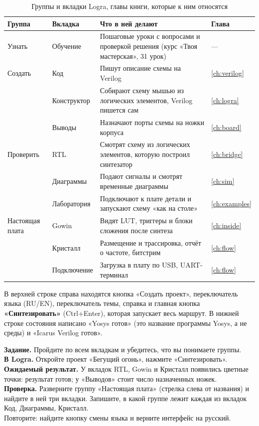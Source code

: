 \begin{table}[H]
\centering
\caption{Группы и вкладки Logra, главы книги, которые к ним относятся}
\small
\begin{tabularx}{\textwidth}{l l X l}
\toprule
\textbf{Группа} & \textbf{Вкладка} & \textbf{Что в ней делают} & \textbf{Глава} \\
\midrule
Узнать & Обучение & Пошаговые уроки с вопросами и проверкой решения (курс «Твоя мастерская», 31 урок) & --- \\
\midrule
Создать & Код & Пишут описание схемы на Verilog & \ref{ch:verilog} \\
 & Конструктор & Собирают схему мышью из логических элементов, Verilog пишется сам & \ref{ch:logra} \\
 & Выводы & Назначают порты схемы на ножки корпуса & \ref{ch:board} \\
\midrule
Проверить & RTL & Смотрят схему из логических элементов, которую построил синтезатор & \ref{ch:bridge} \\
 & Диаграммы & Подают сигналы и смотрят временные диаграммы & \ref{ch:sim} \\
 & Лаборатория & Подключают к плате детали и запускают схему «как на столе» & \ref{ch:examples} \\
\midrule
Настоящая плата & Gowin & Видят LUT, триггеры и блоки сложения после синтеза & \ref{ch:inside} \\
 & Кристалл & Размещение и трассировка, отчёт о частоте, битстрим & \ref{ch:flow} \\
 & Подключение & Загрузка в плату по USB, UART-терминал & \ref{ch:flow} \\
\bottomrule
\end{tabularx}
\end{table}

В верхней строке справа находятся кнопка «Создать проект», переключатель
языка (RU/EN), переключатель темы, справка и главная кнопка
\textbf{«Синтезировать»} (Ctrl+Enter), которая запускает весь маршрут. В
нижней строке состояния написано «Yosys готов» (это название программы
Yosys, а не среды) и «Icarus Verilog готов».

\begin{diybox}
\textbf{Задание.} Пройдите по всем вкладкам и убедитесь, что вы понимаете
группы.\\
\textbf{В Logra.} Откройте проект «Бегущий огонь», нажмите «Синтезировать».\\
\textbf{Ожидаемый результат.} У вкладок RTL, Gowin и Кристалл появились
цветные точки: результат готов; у «Выводов» стоит число назначенных ножек.\\
\textbf{Проверка.} Разверните группу «Настоящая плата» (стрелка слева от
названия) и найдите в ней три вкладки. Запишите, в какой группе лежит каждая из
вкладок Код, Диаграммы, Кристалл.\\
 Повторите: найдите кнопку смены языка и верните интерфейс на русский.
\end{diybox}

